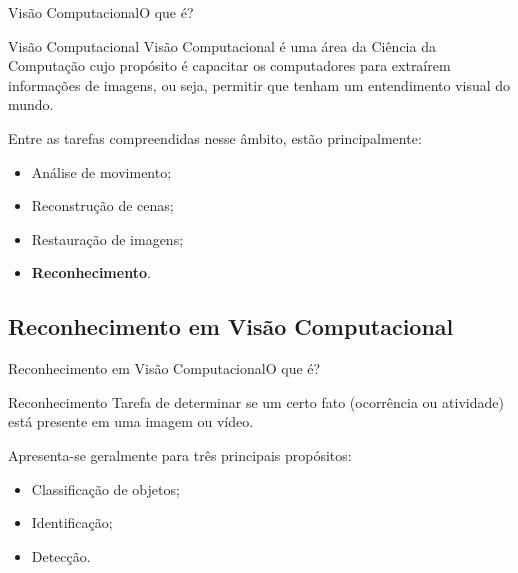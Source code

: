 \documentclass{beamer}
\begin{document}
\begin{frame}{Visão Computacional}{O que é?}

        \begin{block}{Visão Computacional}
        Visão Computacional é uma área da Ciência da Computação
        cujo propósito é capacitar os computadores para extraírem
        informações de imagens, ou seja, permitir que tenham
        um entendimento visual do mundo.
        \end{block}

        \pause

        \vspace{.3cm}
        
        Entre as tarefas compreendidas nesse âmbito, estão principalmente:
        \begin{itemize}
            \item<3-> Análise de movimento;
            \item<4-> Reconstrução de cenas;
            \item<5-> Restauração de imagens;
            \item<6-> \textbf{Reconhecimento}.
        \end{itemize} 


    \end{frame}

\subsection{Reconhecimento em Visão Computacional}
    \begin{frame}{Reconhecimento em Visão Computacional}{O que é?}

        \begin{block}{Reconhecimento}
            Tarefa de determinar se um certo fato (ocorrência ou atividade) está presente em uma imagem ou vídeo. 
        \end{block}

        \pause

        Apresenta-se geralmente para três principais propósitos:

        \begin{itemize}
            \item<3-> Classificação de objetos;
            \item<4-> Identificação;
            \item<5-> Detecção.
        \end{itemize}

    \end{frame}
\end{document}
